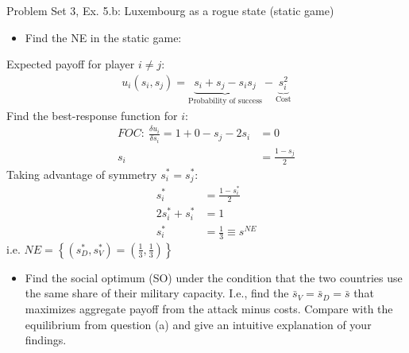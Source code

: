 \begin{frame}{Problem Set 3, Ex. 5.b: Luxembourg as a rogue state (static game)}
  \begin{multicols}{2}
    \begin{itemize}
      \item[(a)] Find the NE in the static game:
    \end{itemize}
    Expected payoff for player $i\neq j$:
    \begin{align*}
      u_i(s_i,s_j)=\underbrace{s_i+s_j-s_is_j}_\text{Probability of success}-\underbrace{s_i^2}_\text{Cost}
    \end{align*}
    Find the best-response function for $i$:
    \begin{align*}
      FOC:\ \frac{\delta u_i}{\delta s_i}=1+0-s_j-2s_i&=0\\
       s_i&=\frac{1-s_j}{2}
    \end{align*}
    Taking advantage of symmetry $s_i^{*}=s_j^{*}$:
    \begin{align*}
       s_i^{*}&=\frac{1-s_i^{*}}{2}\\
      2s_i^{*}+s_i^{*}&=1\\
       s_i^{*}&=\frac{1}{3}\equiv s^{NE}
    \end{align*}
    i.e. $NE=\left\{(s_D^{*},s_V^{*})=(\frac{1}{3},\frac{1}{3})\right\}$
  \vfill\null\columnbreak
    \begin{itemize}
      \item[(b)] Find the social optimum (SO) under the condition that the two countries use the same share of their military capacity. I.e., find the $\bar{s}_V=\bar{s}_D=\bar{s}$ that maximizes aggregate payoff from the attack minus costs. Compare with the equilibrium from question (a) and give an intuitive explanation of your findings.
    \end{itemize}
  \vfill\null
  \end{multicols}
\end{frame}

